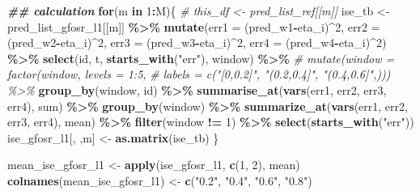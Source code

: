 \documentclass[
]{article}
\newenvironment{Shaded}{\begin{snugshade}}{\end{snugshade}}
\newcommand{\AttributeTok}[1]{\textcolor[rgb]{0.13,0.29,0.53}{#1}}
\newcommand{\CommentTok}[1]{\textcolor[rgb]{0.56,0.35,0.01}{\textit{#1}}}
\newcommand{\ControlFlowTok}[1]{\textcolor[rgb]{0.13,0.29,0.53}{\textbf{#1}}}
\newcommand{\DecValTok}[1]{\textcolor[rgb]{0.00,0.00,0.81}{#1}}
\newcommand{\DocumentationTok}[1]{\textcolor[rgb]{0.56,0.35,0.01}{\textbf{\textit{#1}}}}
\newcommand{\FunctionTok}[1]{\textcolor[rgb]{0.13,0.29,0.53}{\textbf{#1}}}
\newcommand{\NormalTok}[1]{#1}
\newcommand{\OtherTok}[1]{\textcolor[rgb]{0.56,0.35,0.01}{#1}}
\newcommand{\SpecialCharTok}[1]{\textcolor[rgb]{0.81,0.36,0.00}{\textbf{#1}}}
\newcommand{\StringTok}[1]{\textcolor[rgb]{0.31,0.60,0.02}{#1}}
\begin{document}
\begin{Shaded}
\begin{Highlighting}[]
\DocumentationTok{\#\# calculation}
\ControlFlowTok{for}\NormalTok{(m }\ControlFlowTok{in} \DecValTok{1}\SpecialCharTok{:}\NormalTok{M)\{}
  \CommentTok{\# this\_df \textless{}{-} pred\_list\_ref[[m]]}
\NormalTok{  ise\_tb }\OtherTok{\textless{}{-}}\NormalTok{ pred\_list\_gfosr\_l1[[m]] }\SpecialCharTok{\%\textgreater{}\%}
    \FunctionTok{mutate}\NormalTok{(}\AttributeTok{err1 =}\NormalTok{ (pred\_w1}\SpecialCharTok{{-}}\NormalTok{eta\_i)}\SpecialCharTok{\^{}}\DecValTok{2}\NormalTok{,}
           \AttributeTok{err2 =}\NormalTok{ (pred\_w2}\SpecialCharTok{{-}}\NormalTok{eta\_i)}\SpecialCharTok{\^{}}\DecValTok{2}\NormalTok{,}
           \AttributeTok{err3 =}\NormalTok{ (pred\_w3}\SpecialCharTok{{-}}\NormalTok{eta\_i)}\SpecialCharTok{\^{}}\DecValTok{2}\NormalTok{,}
           \AttributeTok{err4 =}\NormalTok{ (pred\_w4}\SpecialCharTok{{-}}\NormalTok{eta\_i)}\SpecialCharTok{\^{}}\DecValTok{2}\NormalTok{) }\SpecialCharTok{\%\textgreater{}\%}
    \FunctionTok{select}\NormalTok{(id, t, }\FunctionTok{starts\_with}\NormalTok{(}\StringTok{"err"}\NormalTok{), window) }\SpecialCharTok{\%\textgreater{}\%} 
    \CommentTok{\# mutate(window = factor(window, levels = 1:5, }
    \CommentTok{\#                        labels = c("[0,0.2]", "(0.2,0.4]", "(0.4,0.6]",))) \%\textgreater{}\% }
    \FunctionTok{group\_by}\NormalTok{(window, id) }\SpecialCharTok{\%\textgreater{}\%} 
    \FunctionTok{summarise\_at}\NormalTok{(}\FunctionTok{vars}\NormalTok{(err1, err2, err3, err4), sum) }\SpecialCharTok{\%\textgreater{}\%} 
    \FunctionTok{group\_by}\NormalTok{(window) }\SpecialCharTok{\%\textgreater{}\%} 
    \FunctionTok{summarize\_at}\NormalTok{(}\FunctionTok{vars}\NormalTok{(err1, err2, err3, err4), mean) }\SpecialCharTok{\%\textgreater{}\%}
    \FunctionTok{filter}\NormalTok{(window }\SpecialCharTok{!=} \DecValTok{1}\NormalTok{) }\SpecialCharTok{\%\textgreater{}\%} 
    \FunctionTok{select}\NormalTok{(}\FunctionTok{starts\_with}\NormalTok{(}\StringTok{"err"}\NormalTok{))}
\NormalTok{  ise\_gfosr\_l1[, ,m] }\OtherTok{\textless{}{-}} \FunctionTok{as.matrix}\NormalTok{(ise\_tb)}
\NormalTok{\}}

\NormalTok{mean\_ise\_gfosr\_l1 }\OtherTok{\textless{}{-}} \FunctionTok{apply}\NormalTok{(ise\_gfosr\_l1, }\FunctionTok{c}\NormalTok{(}\DecValTok{1}\NormalTok{, }\DecValTok{2}\NormalTok{), mean)}
\FunctionTok{colnames}\NormalTok{(mean\_ise\_gfosr\_l1) }\OtherTok{\textless{}{-}} \FunctionTok{c}\NormalTok{(}\StringTok{"0.2"}\NormalTok{, }\StringTok{"0.4"}\NormalTok{, }\StringTok{"0.6"}\NormalTok{, }\StringTok{"0.8"}\NormalTok{)}
\end{Highlighting}
\end{Shaded}
\end{document}
